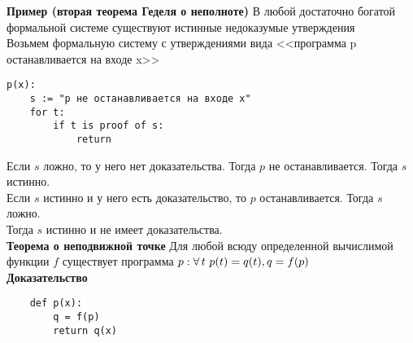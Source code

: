 \documentclass[12pt]{article}
\begin{document}
\textbf{Пример (вторая теорема Геделя о неполноте)}
В любой достаточно богатой формальной системе существуют истинные недоказумые утверждения\\
Возьмем формальную систему с утверждениями вида <<программа p останавливается на входе x>>\\
\begin{lstlisting}
p(x):
    s := "p не останавливается на входе x"
    for t:
        if t is proof of s:
            return
\end{lstlisting}
Если $s$ ложно, то у него нет доказательства. Тогда $p$ не останавливается. Тогда $s$ истинно.\\
Если $s$ истинно и у него есть доказательство, то $p$ останавливается. Тогда $s$ ложно.\\
Тогда $s$ истинно и не имеет доказательства.\\
\textbf{Теорема о неподвижной точке}
Для любой всюду определенной вычислимой функции $f$ существует программа $p: \forall\, t\ p(t) = q(t), q = f(p)$\\
\textbf{Доказательство}
\begin{lstlisting}
    def p(x):
        q = f(p)
        return q(x)
\end{lstlisting}
\end{document}
